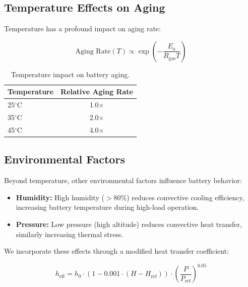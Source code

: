 \subsection{Temperature Effects on Aging}
\label{subsec:temp_aging}

Temperature has a profound impact on aging rate:

\begin{equation}
    \text{Aging Rate}(T) \propto \exp\left(-\frac{E_a}{R_{\text{gas}} T}\right)
    \label{eq:temp_aging}
\end{equation}

\begin{table}[H]
    \centering
    \caption{Temperature impact on battery aging.}
    \label{tab:temp_aging}
    \begin{tabular}{lc}
        \toprule
        \textbf{Temperature} & \textbf{Relative Aging Rate} \\
        \midrule
        25$^\circ$C & 1.0$\times$ \\
        35$^\circ$C & 2.0$\times$ \\
        45$^\circ$C & 4.0$\times$ \\
        \bottomrule
    \end{tabular}
\end{table}

\subsection{Environmental Factors}
\label{subsec:environmental}

Beyond temperature, other environmental factors influence battery behavior:

\begin{itemize}
    \item \textbf{Humidity:} High humidity ($>$80\%) reduces convective cooling efficiency, increasing battery temperature during high-load operation.
    
    \item \textbf{Pressure:} Low pressure (high altitude) reduces convective heat transfer, similarly increasing thermal stress.
\end{itemize}

We incorporate these effects through a modified heat transfer coefficient:

\begin{equation}
    h_{\text{eff}} = h_0 \cdot \left(1 - 0.001 \cdot (H - H_{\text{ref}})\right) \cdot \left(\frac{P}{P_{\text{ref}}}\right)^{0.05}
    \label{eq:h_eff}
\end{equation}

